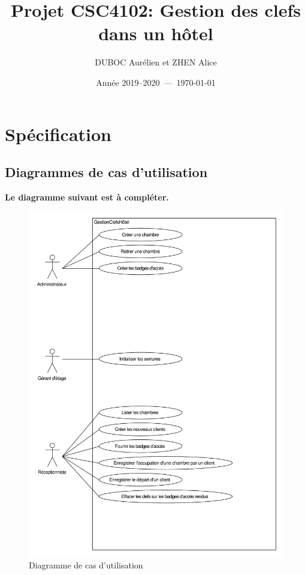 \documentclass[11pt,article]{article}
\begin{document}
\title{Projet CSC4102: Gestion des clefs dans un hôtel}
\author{DUBOC Aurélien et ZHEN Alice}
\date{Année 2019--2020~---~\today}
\maketitle

\newpage

\tableofcontents

\newpage

\section{Spécification}

\subsection{Diagrammes de cas d'utilisation}

{\color{red}\textbf{Le diagramme suivant est à compléter.}}

\begin{figure}[h!]
\begin{center}
\includegraphics[scale=0.5]{DiagrammesDeCasDUtilisation/gestionclefshotel_uml_diag_cas_utilisation}
\caption{Diagramme de cas d'utilisation}
\end{center}
\label{umlet_diag_cas_utilisation}
\end{figure}
\end{document}
